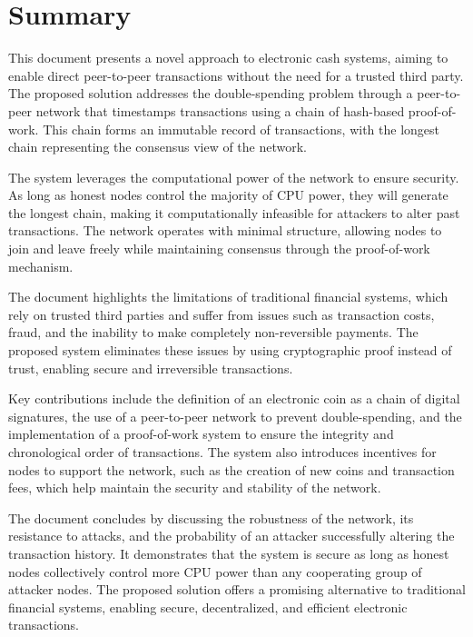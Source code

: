 \documentclass{article}
\begin{document}
\section*{Summary}

This document presents a novel approach to electronic cash systems, aiming to enable direct peer-to-peer transactions without the need for a trusted third party. The proposed solution addresses the double-spending problem through a peer-to-peer network that timestamps transactions using a chain of hash-based proof-of-work. This chain forms an immutable record of transactions, with the longest chain representing the consensus view of the network.

The system leverages the computational power of the network to ensure security. As long as honest nodes control the majority of CPU power, they will generate the longest chain, making it computationally infeasible for attackers to alter past transactions. The network operates with minimal structure, allowing nodes to join and leave freely while maintaining consensus through the proof-of-work mechanism.

The document highlights the limitations of traditional financial systems, which rely on trusted third parties and suffer from issues such as transaction costs, fraud, and the inability to make completely non-reversible payments. The proposed system eliminates these issues by using cryptographic proof instead of trust, enabling secure and irreversible transactions.

Key contributions include the definition of an electronic coin as a chain of digital signatures, the use of a peer-to-peer network to prevent double-spending, and the implementation of a proof-of-work system to ensure the integrity and chronological order of transactions. The system also introduces incentives for nodes to support the network, such as the creation of new coins and transaction fees, which help maintain the security and stability of the network.

The document concludes by discussing the robustness of the network, its resistance to attacks, and the probability of an attacker successfully altering the transaction history. It demonstrates that the system is secure as long as honest nodes collectively control more CPU power than any cooperating group of attacker nodes. The proposed solution offers a promising alternative to traditional financial systems, enabling secure, decentralized, and efficient electronic transactions.
\end{document}
